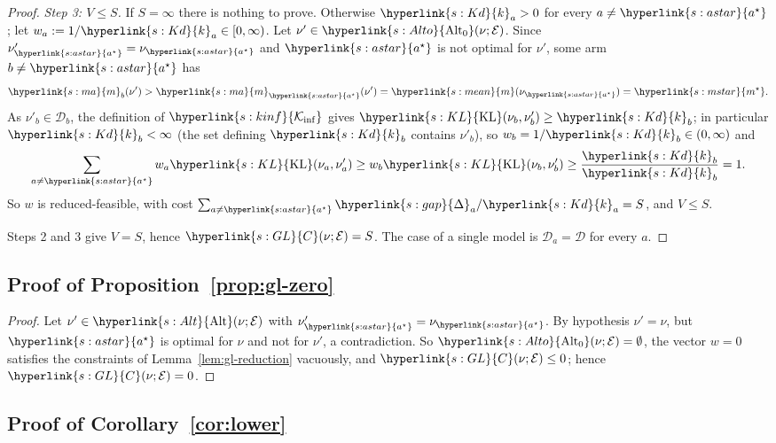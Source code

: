 \documentclass[11pt]{article}
\newcommand{\sy}[2]{{\hyperlink{#1}{#2}}}
\newcommand{\mean}{\sy{s:mean}{m}}
\newcommand{\KL}{\sy{s:KL}{\mathrm{KL}}}
\newcommand{\Kinf}{\sy{s:kinf}{\mathcal{K}_{\inf}}}
\newcommand{\marm}{\sy{s:ma}{m}}
\newcommand{\ms}{\sy{s:mstar}{m^{\star}}}
\newcommand{\gap}{\sy{s:gap}{\Delta}}
\newcommand{\as}{\sy{s:astar}{a^{\star}}}
\newcommand{\Alt}{\sy{s:Alt}{\mathrm{Alt}}}
\newcommand{\Alto}{\sy{s:Alto}{\mathrm{Alt}_{0}}}
\newcommand{\GL}{\sy{s:GL}{C}}
\newcommand{\Kd}{\sy{s:Kd}{k}}
\begin{document}
\begin{proof}
\emph{Step 3: $V\le S$.} If $S=\infty$ there is nothing to prove. Otherwise $\Kd_a>0$ for every
$a\ne\as$; let $w_a:=1/\Kd_a\in[0,\infty)$. Let $\nu'\in\Alto(\nu;\mathcal E)$. Since
$\nu'_{\as}=\nu_{\as}$ and $\as$ is not optimal for $\nu'$, some arm $b\ne\as$ has
\begin{equation*}
  \marm_b(\nu')>\marm_{\as}(\nu')=\mean(\nu_{\as})=\ms.
\end{equation*}
As $\nu'_b\in\mathcal D_b$, the definition of $\Kinf$ gives $\KL(\nu_b,\nu'_b)\ge\Kd_b$; in
particular $\Kd_b<\infty$ (the set defining $\Kd_b$ contains $\nu'_b$), so $w_b=1/\Kd_b\in(0,\infty)$ and
\begin{equation*}
  \sum_{a\ne\as}w_a\KL(\nu_a,\nu'_a)\ge w_b\KL(\nu_b,\nu'_b)\ge\frac{\Kd_b}{\Kd_b}=1.
\end{equation*}
So $w$ is reduced-feasible, with cost $\sum_{a\ne\as}\gap_a/\Kd_a=S$, and $V\le S$.

Steps 2 and 3 give $V=S$, hence $\GL(\nu;\mathcal E)=S$. The case of a single model is
$\mathcal D_a=\mathcal D$ for every $a$.
\end{proof}

\subsection{Proof of Proposition~\ref{prop:gl-zero}}\label{sec:proof-gl-zero}

\begin{proof}
Let $\nu'\in\Alt(\nu;\mathcal E)$ with $\nu'_{\as}=\nu_{\as}$. By hypothesis $\nu'=\nu$, but $\as$ is
optimal for $\nu$ and not for $\nu'$, a contradiction. So $\Alto(\nu;\mathcal E)=\emptyset$, the
vector $w=0$ satisfies the constraints of Lemma~\ref{lem:gl-reduction} vacuously, and
$\GL(\nu;\mathcal E)\le0$; hence $\GL(\nu;\mathcal E)=0$.
\end{proof}

\subsection{Proof of Corollary~\ref{cor:lower}}\label{sec:proof-lower}
\end{document}

